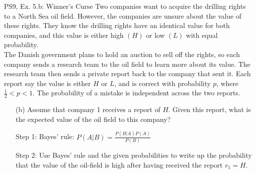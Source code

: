 \begin{frame}{PS9, Ex. 5.b: Winner's Curse}
      Two companies want to acquire the drilling rights to a North Sea oil field. However, the companies are unsure about the value of these rights. They know the drilling rights have an identical value for both companies, and this value is either high $(H)$ or low $(L)$ with equal probability.\\\medskip
      The Danish government plans to hold an auction to sell off the rights, so each company sends a research team to the oil field to learn more about its value. The research team then sends a private report back to the company that sent it. Each report say the value is either $H$ or $L$, and is correct with probability $p$, where $\frac{1}{2} < p < 1$. The probability of a mistake is independent across the two reports.
      \begin{itemize}
        \item[(b)] Assume that company 1 receives a report of $H$. Given this report, what is the expected value of the oil field to this company?
        \item[Step 1:] Bayes' rule: $P(A|B)=\frac{P(B|A)P(A)}{P(B)}$
        \item[Step 2:] Use Bayes' rule and the given probabilities to write up the probability that the value of the oil-field is high after having received the report $r_1=H$.
      \end{itemize}
      \vfill\null
\end{frame}
